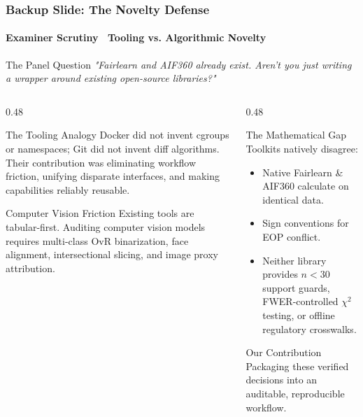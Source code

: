 \begin{frame}
  \frametitle{Backup Slide: The Novelty Defense}
  \framesubtitle{Examiner Scrutiny \textbar\ Tooling vs. Algorithmic Novelty}

  \begin{alertcard}{The Panel Question}
    \scriptsize \textit{"Fairlearn and AIF360 already exist. Aren't you just writing a wrapper around existing open-source libraries?"}
  \end{alertcard}

  \vspace{0.05cm}
  \begin{columns}[T]
    \begin{column}{0.48\textwidth}
      \begin{card}{The Tooling Analogy}
        \scriptsize Docker did not invent cgroups or namespaces; Git did not invent diff algorithms. Their contribution was eliminating workflow friction, unifying disparate interfaces, and making capabilities reliably reusable.
      \end{card}

      \vspace{0.05cm}
      \begin{card}{Computer Vision Friction}
        \scriptsize Existing tools are tabular-first. Auditing computer vision models requires multi-class OvR binarization, face alignment, intersectional slicing, and image proxy attribution.
      \end{card}
    \end{column}

    \begin{column}{0.48\textwidth}
      \begin{statcard}{The Mathematical Gap}
        \scriptsize Toolkits natively disagree:
        \begin{itemize}\tiny
          \item Native Fairlearn \& AIF360 calculate  on identical data.
          \item Sign conventions for EOP conflict.
          \item Neither library provides $n < 30$ support guards, FWER-controlled $\chi^2$ testing, or offline regulatory crosswalks.
        \end{itemize}
      \end{statcard}

      \vspace{0.05cm}
      \begin{successcard}{Our Contribution}
        \scriptsize Packaging these verified decisions into an auditable, reproducible workflow.
      \end{successcard}
    \end{column}
  \end{columns}
\end{frame}

